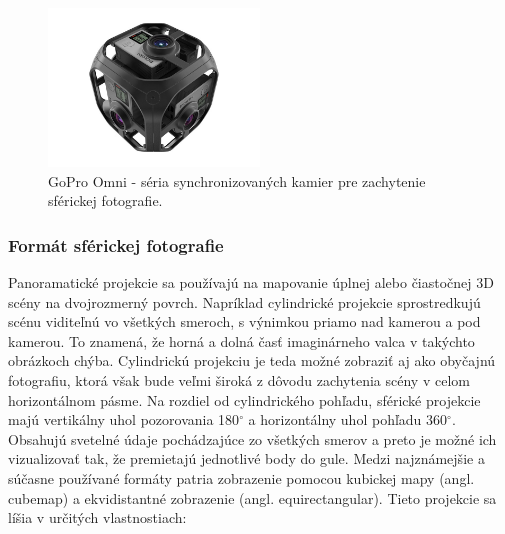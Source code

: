 \documentclass[slovak,master,dept460,male,cpp,cpdeclaration]{diploma}
\begin{document}
\begin{figure}[H]
	\centering
	\includegraphics[width=0.5\textwidth]{Figures/goproOmni.jpg}
	\caption{GoPro Omni - séria synchronizovaných kamier pre zachytenie sférickej fotografie.\cite{goproOmni}}
	\label{fig:goproOmni}
\end{figure}


\subsubsection*{Formát sférickej fotografie}
Panoramatické projekcie sa používajú na mapovanie úplnej alebo čiastočnej 3D scény na dvojrozmerný povrch. Napríklad cylindrické projekcie sprostredkujú scénu viditeľnú vo všetkých smeroch, s výnimkou priamo nad kamerou a pod kamerou. To znamená, že horná a dolná časť imaginárneho valca v takýchto obrázkoch chýba. Cylindrickú projekciu je teda možné zobraziť aj ako obyčajnú fotografiu, ktorá však bude veľmi  široká z dôvodu zachytenia scény v celom horizontálnom pásme.
Na rozdiel od cylindrického pohľadu, sférické projekcie majú vertikálny uhol pozorovania 180$ ^\circ$ a horizontálny uhol pohľadu 360$ ^\circ$. Obsahujú svetelné údaje pochádzajúce zo všetkých smerov a preto je možné ich vizualizovať tak, že premietajú jednotlivé body do gule. Medzi najznámejšie  a súčasne používané formáty patria zobrazenie pomocou kubickej mapy (angl. cubemap) a ekvidistantné zobrazenie (angl. equirectangular). Tieto projekcie  sa líšia v určitých vlastnostiach:
\end{document}
